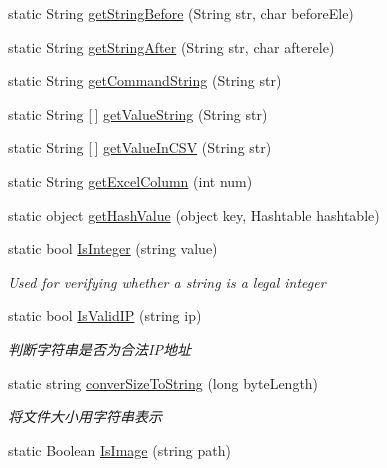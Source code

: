 \begin{DoxyCompactItemize}
\item 
static String \hyperlink{classcustom__cloud_1_1_code_analysis_abf033734f8ce91fff8633517901cbf35}{get\+String\+Before} (String str, char before\+Ele)
\item 
static String \hyperlink{classcustom__cloud_1_1_code_analysis_a5b97c0b0bd76fff16863ecb9b1eb6344}{get\+String\+After} (String str, char afterele)
\item 
static String \hyperlink{classcustom__cloud_1_1_code_analysis_afaf2b4b2ce446ca8d29189d351bbc482}{get\+Command\+String} (String str)
\item 
static String \mbox{[}$\,$\mbox{]} \hyperlink{classcustom__cloud_1_1_code_analysis_ac36ac2e0008efa062b539242c27f0594}{get\+Value\+String} (String str)
\item 
static String \mbox{[}$\,$\mbox{]} \hyperlink{classcustom__cloud_1_1_code_analysis_a031a6c08e3c1e8369f565d4e707e4d0e}{get\+Value\+In\+C\+SV} (String str)
\item 
static String \hyperlink{classcustom__cloud_1_1_code_analysis_a9bcb17a42abde0d3f75e0db1ce64a9ed}{get\+Excel\+Column} (int num)
\item 
static object \hyperlink{classcustom__cloud_1_1_code_analysis_a95f59e68465551a5a534aec92c2c8392}{get\+Hash\+Value} (object key, Hashtable hashtable)
\item 
static bool \hyperlink{classcustom__cloud_1_1_code_analysis_a6175355d66de01019390cf6bd6d6bfb3}{Is\+Integer} (string value)
\begin{DoxyCompactList}\small\item\em Used for verifying whether a string is a legal integer \end{DoxyCompactList}\item 
static bool \hyperlink{classcustom__cloud_1_1_code_analysis_a09b98c4da70cc952058b2a8db7fcdd0b}{Is\+Valid\+IP} (string ip)
\begin{DoxyCompactList}\small\item\em 判断字符串是否为合法\+I\+P地址 \end{DoxyCompactList}\item 
static string \hyperlink{classcustom__cloud_1_1_code_analysis_a4e526a7224e5db6aea7589258a4096fa}{conver\+Size\+To\+String} (long byte\+Length)
\begin{DoxyCompactList}\small\item\em 将文件大小用字符串表示 \end{DoxyCompactList}\item 
static Boolean \hyperlink{classcustom__cloud_1_1_code_analysis_aeb6de2f9ee300b37b6a310a0e2d9b95a}{Is\+Image} (string path)
\end{DoxyCompactItemize}


